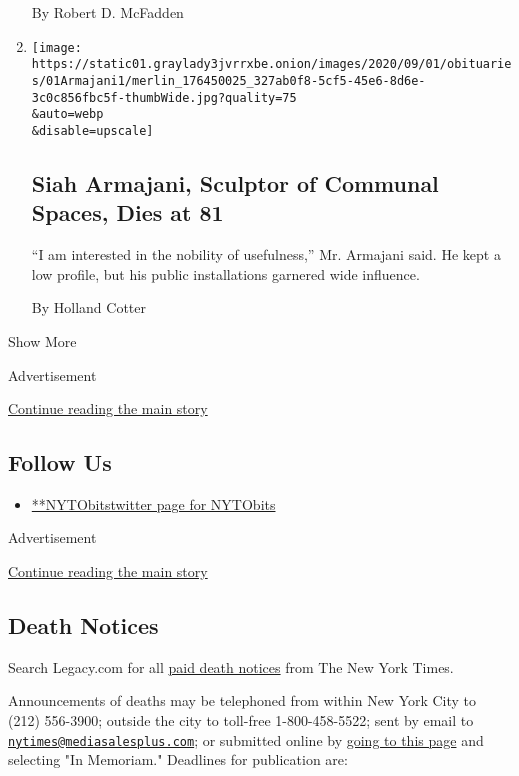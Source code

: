 \begin{enumerate}
  By Robert D. McFadden
\item
  \href{/2020/09/03/arts/siah-armajani-sculptor-dead-81.html}{}

  \texttt{[image: https://static01.graylady3jvrrxbe.onion/images/2020/09/01/obituaries/01Armajani1/merlin\_176450025\_327ab0f8-5cf5-45e6-8d6e-3c0c856fbc5f-thumbWide.jpg?quality=75\\\&auto=webp\\\&disable=upscale]}

  \hypertarget{siah-armajani-sculptor-of-communal-spaces-dies-at-81}{%
  \subsection{Siah Armajani, Sculptor of Communal Spaces, Dies at
  81}\label{siah-armajani-sculptor-of-communal-spaces-dies-at-81}}

  ``I am interested in the nobility of usefulness,'' Mr. Armajani said.
  He kept a low profile, but his public installations garnered wide
  influence.

  By Holland Cotter
\end{enumerate}

Show More

Advertisement

\protect\hyperlink{after-mid3}{Continue reading the main story}

\hypertarget{follow-us}{%
\subsection{Follow Us}\label{follow-us}}

\begin{itemize}
\tightlist
\item
  \href{https://twitter.com/NYTObits}{**NYTObitstwitter page for
  NYTObits}
\end{itemize}

Advertisement

\protect\hyperlink{after-mktg}{Continue reading the main story}

\hypertarget{death-notices}{%
\subsection{Death Notices}\label{death-notices}}

Search Legacy.com for all \href{https://www.legacy.com/NYTimes/}{paid
death notices} from The New York Times.

Announcements of deaths may be telephoned from within New York City to
(212) 556-3900; outside the city to toll-free 1-800-458-5522; sent by
email to
\href{mailto:nytimes@mediasalesplus.com}{\nolinkurl{nytimes@mediasalesplus.com}};
or submitted online by
\href{https://advertising.nytimes3xbfgragh.onion/irj/go/nyt/prtroot/fwk/classified}{going
to this page} and selecting "In Memoriam." Deadlines for publication
are:

